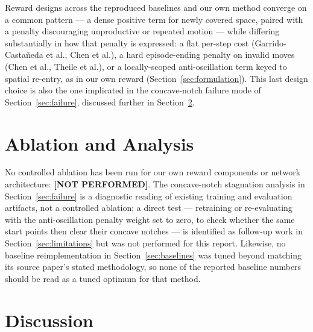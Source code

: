 \documentclass[conference]{IEEEtran}
\begin{document}
Reward designs across the reproduced baselines and our own method converge on a common pattern --- a dense positive term for newly covered space, paired with a penalty discouraging unproductive or repeated motion --- while differing substantially in how that penalty is expressed: a flat per-step cost (Garrido-Casta\~neda et al., Chen et al.), a hard episode-ending penalty on invalid moves (Chen et al., Theile et al.), or a locally-scoped anti-oscillation term keyed to spatial re-entry, as in our own reward (Section~\ref{sec:formulation}). This last design choice is also the one implicated in the concave-notch failure mode of Section~\ref{sec:failure}, discussed further in Section~\ref{sec:discussion}.

\section{Ablation and Analysis}
\label{sec:ablation}

No controlled ablation has been run for our own reward components or network architecture: \textbf{[NOT PERFORMED]}. The concave-notch stagnation analysis in Section~\ref{sec:failure} is a diagnostic reading of existing training and evaluation artifacts, not a controlled ablation; a direct test --- retraining or re-evaluating with the anti-oscillation penalty weight set to zero, to check whether the same start points then clear their concave notches --- is identified as follow-up work in Section~\ref{sec:limitations} but was not performed for this report. Likewise, no baseline reimplementation in Section~\ref{sec:baselines} was tuned beyond matching its source paper's stated methodology, so none of the reported baseline numbers should be read as a tuned optimum for that method.

\section{Discussion}
\label{sec:discussion}
\end{document}
